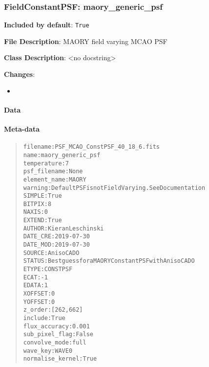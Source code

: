 \subsubsection{FieldConstantPSF: \textquotedbl{}maory\_generic\_psf\textquotedbl{}%
  \label{fieldconstantpsf-maory-generic-psf}%
}

\textbf{Included by default}: \texttt{True}

\textbf{File Description}: MAORY field varying MCAO PSF

\textbf{Class Description}: <no docstring>

\textbf{Changes}:

\begin{itemize}
\item \end{itemize}


\paragraph{Data%
  \label{id1}%
}


\paragraph{Meta-data%
  \label{id2}%
}

\begin{quote}
\begin{alltt}
        filename : PSF_MCAO_ConstPSF_40_18_6.fits
            name : maory_generic_psf
     temperature : 7
    psf_filename : None
    element_name : MAORY
         warning : Default PSF is not Field Varying. See Documentation
          SIMPLE : True
          BITPIX : 8
           NAXIS : 0
          EXTEND : True
          AUTHOR : Kieran Leschinski
        DATE_CRE : 2019-07-30
        DATE_MOD : 2019-07-30
          SOURCE : AnisoCADO
          STATUS : Best guess for a MAORY ConstantPSF with AnisoCADO
           ETYPE : CONSTPSF
            ECAT : -1
           EDATA : 1
         XOFFSET : 0
         YOFFSET : 0
         z_order : [262, 662]
         include : True
   flux_accuracy : 0.001
  sub_pixel_flag : False
   convolve_mode : full
        wave_key : WAVE0
normalise_kernel : True
\end{alltt}
\end{quote}
